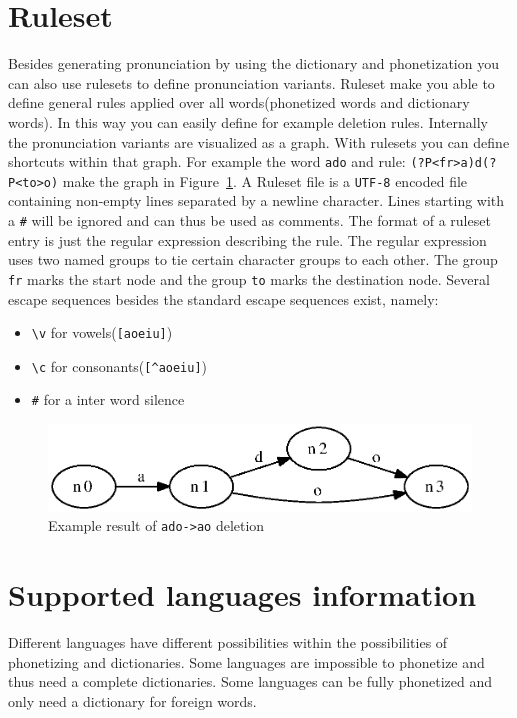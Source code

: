 \documentclass[twoside,a4paper]{book}
\begin{document}
\section{Ruleset}
Besides generating pronunciation by using the dictionary and phonetization you
can also use rulesets to define pronunciation variants. Ruleset make you able
to define general rules applied over all words(phonetized words and dictionary
words). In this way you can easily define for example deletion rules.
Internally the pronunciation variants are visualized as a graph. With rulesets
you can define shortcuts within that graph. For example the word \texttt{ado}
and rule: \texttt{(?P<fr>a)d(?P<to>o)} make the graph in
Figure~\ref{fig:ruleset_example}. A Ruleset file is a \texttt{UTF-8} encoded
file containing non-empty lines separated by a newline character. Lines
starting with a \texttt{\#} will be ignored and can thus be used as comments.
The format of a ruleset entry is just the regular expression describing the
rule. The regular expression uses two named groups to tie certain character
groups to each other. The group \texttt{fr} marks the start node and the group
\texttt{to} marks the destination node.  Several escape sequences besides the
standard escape sequences exist, namely:
\begin{itemize}
	\item \texttt{\textbackslash v} for vowels(\texttt{[aoeiu]})
	\item \texttt{\textbackslash c} for consonants(\texttt{[\textasciicircum aoeiu]})
	\item \texttt{\#} for a inter word silence
\end{itemize}

\begin{figure}[H]
	\label{fig:ruleset_example}
	\centering
	\includegraphics[scale=0.3]{./fig_ruleset_example.eps}
	\caption{Example result of \texttt{ado->ao} deletion}
\end{figure}

\section{Supported languages information}
Different languages have different possibilities within the possibilities of
phonetizing and dictionaries. Some languages are impossible to phonetize and
thus need a complete dictionaries. Some languages can be fully phonetized and
only need a dictionary for foreign words.
\end{document}
